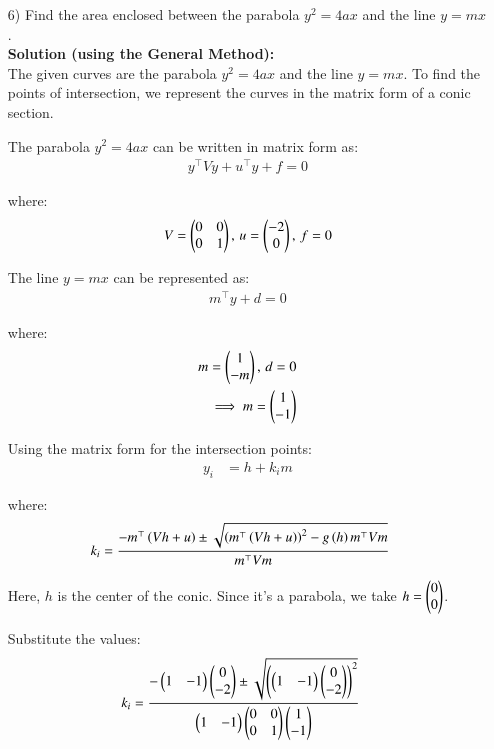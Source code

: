 \documentclass[journal]{IEEEtran}
\begin{document}
\begin{enumerate}
\item [6)] Find the area enclosed between the parabola $y^2 = 4ax$ and the line $y = mx$.\\

\textbf{Solution (using the General Method):}\\
The given curves are the parabola $y^2 = 4ax$ and the line $y = mx$. To find the points of intersection, we represent the curves in the matrix form of a conic section.

The parabola $y^2 = 4ax$ can be written in matrix form as:
\begin{align}
y^\top V y + u^\top y + f = 0
\end{align}

where:
\begin{align}
V = \begin{pmatrix}0 & 0 \\ 0 & 1\end{pmatrix}, \, u = \begin{pmatrix}-2 \\ 0\end{pmatrix}, \, f = 0
\end{align}

The line $y = mx$ can be represented as:
\begin{align}
m^\top y + d = 0
\end{align}

where:
\begin{align}
m = \begin{pmatrix}1 \\ -m\end{pmatrix}, \, d = 0 \\
\implies m = \begin{pmatrix}1 \\ -1\end{pmatrix}
\end{align}

Using the matrix form for the intersection points:
\begin{align}
y_i &= h + k_i m
\end{align}

where:
\begin{align}
k_i &= \frac{-m^\top \left(Vh + u\right) \pm \sqrt{\left(m^\top \left(Vh + u\right)\right)^2 - g\left(h\right) m^\top V m}}{m^\top V m}
\end{align}

Here, $h$ is the center of the conic. Since it's a parabola, we take $h = \begin{pmatrix}0 \\ 0\end{pmatrix}$.

Substitute the values:
\begin{align}
k_i &= \frac{-\begin{pmatrix}1 & -1\end{pmatrix} \begin{pmatrix}0 \\ -2\end{pmatrix} \pm \sqrt{\left(\begin{pmatrix}1 & -1\end{pmatrix} \begin{pmatrix}0 \\ -2\end{pmatrix}\right)^2}}{\begin{pmatrix}1 & -1\end{pmatrix} \begin{pmatrix}0 & 0 \\ 0 & 1\end{pmatrix} \begin{pmatrix}1 \\ -1\end{pmatrix}}
\end{align}


\end{enumerate}
\end{document}
